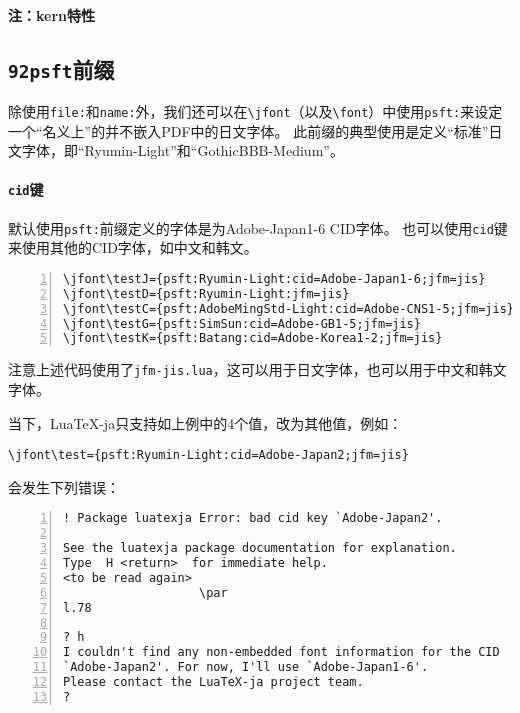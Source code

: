 \documentclass{ltjarticle}
\DeclareRobustCommand\LuaTeX{Lua\TeX}
\begin{document}
\paragraph{注：kern特性}
\subsection{\texttt{\char92psft}前缀}
除使用\texttt{file:}和\texttt{name:}外，我们还可以在\verb!\jfont!（以及\verb!\font!）中使用\texttt{psft:}来设定一个“名义上”的并不嵌入PDF中的日文字体。
此前缀的典型使用是定义“标准”日文字体，即“Ryumin-Light”和“GothicBBB-Medium”。
\paragraph{\texttt{cid}键} 默认使用\texttt{psft:}前缀定义的字体是为Adobe-Japan1-6 CID字体。
也可以使用\texttt{cid}键来使用其他的CID字体，如中文和韩文。
\begin{lstlisting}[numbers=left]
\jfont\testJ={psft:Ryumin-Light:cid=Adobe-Japan1-6;jfm=jis}     % 日语
\jfont\testD={psft:Ryumin-Light:jfm=jis}                        % 默认值为Adobe-Japan1-6
\jfont\testC={psft:AdobeMingStd-Light:cid=Adobe-CNS1-5;jfm=jis} % 繁体中文
\jfont\testG={psft:SimSun:cid=Adobe-GB1-5;jfm=jis}              % 简体中文
\jfont\testK={psft:Batang:cid=Adobe-Korea1-2;jfm=jis}           % 韩文
\end{lstlisting}
注意上述代码使用了\texttt{jfm-jis.lua}，这可以用于日文字体，也可以用于中文和韩文字体。

当下，\LuaTeX-ja只支持如上例中的4个值，改为其他值，例如：
\begin{lstlisting}
\jfont\test={psft:Ryumin-Light:cid=Adobe-Japan2;jfm=jis}
\end{lstlisting}
会发生下列错误：
\begin{lstlisting}[numbers=left]
! Package luatexja Error: bad cid key `Adobe-Japan2'.

See the luatexja package documentation for explanation.
Type  H <return>  for immediate help.
<to be read again>
                   \par
l.78

? h
I couldn't find any non-embedded font information for the CID
`Adobe-Japan2'. For now, I'll use `Adobe-Japan1-6'.
Please contact the LuaTeX-ja project team.
?
\end{lstlisting}
\end{document}
